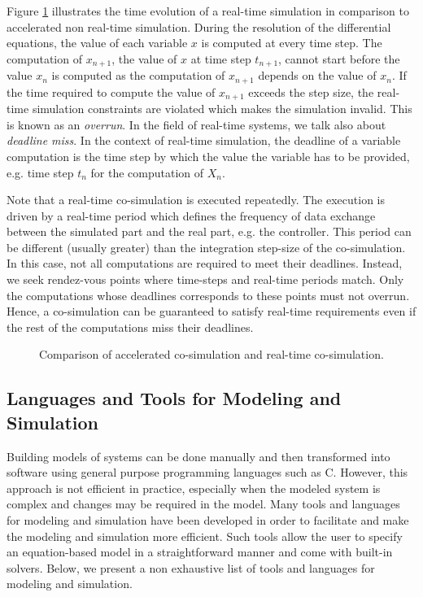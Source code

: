 Figure \ref{fig:rtcosim} illustrates the time evolution of a real-time simulation in comparison to accelerated non real-time simulation. During the resolution of the differential equations, the value of each variable $x$ is computed at every time step. The computation of $x_{n+1}$, the value of $x$ at time step $t_{n+1}$, cannot start before the value $x_n$ is computed as the computation of $x_{n+1}$ depends on the value of $x_n$. If the time required to compute the value of $x_{n+1}$ exceeds the step size, the real-time simulation constraints are violated which makes the simulation invalid. This is known as an \textit{overrun}. In the field of real-time systems, we talk also about \textit{deadline miss}. In the context of real-time simulation, the deadline of a variable computation is the time step by which the value the variable has to be provided, e.g. time step $t_n$ for the computation of $X_n$.

Note that a real-time co-simulation is executed repeatedly. The execution is driven by a real-time period which defines the frequency of data exchange between the simulated part and the real part, e.g. the controller. This period can be different (usually greater) than the integration step-size of the co-simulation. In this case, not all computations are required to meet their deadlines. Instead, we seek rendez-vous points where time-steps and real-time periods match. Only the computations whose deadlines corresponds to these points must not overrun. Hence, a co-simulation can be guaranteed to satisfy real-time requirements even if the rest of the computations miss their deadlines.   

\begin{figure}[phbt]
\centering

\caption{Comparison of accelerated co-simulation and real-time co-simulation.}
\label{fig:rtcosim}
\end{figure} 

\subsection{Languages and Tools for Modeling and Simulation}

Building models of systems can be done manually and then transformed into software using general purpose programming languages such as C. However, this approach is not efficient in practice, especially when the modeled system is complex and changes may be required in the model. Many tools and languages for modeling and simulation have been developed in order to facilitate and make the modeling and simulation more efficient. Such tools allow the user to specify an equation-based model in a straightforward manner and come with built-in solvers. Below, we present a non exhaustive list of tools and languages for modeling and simulation.

